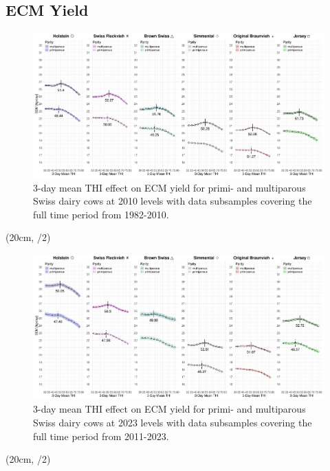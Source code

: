 \newpage
\begin{landscape}
    \thispagestyle{empty}
    \section{ECM Yield}
    \begin{figure}[H]
        \centering
        \includegraphics[width=0.85\paperheight]{thesis/figures/results/ecm_yield_before_2010.png}
        \caption[]{3-day mean THI effect on ECM yield for primi- and multiparous Swiss dairy cows at 2010 levels with data subsamples covering the full time period from 1982-2010.}
        \label{fig:results_ecm_yield_before_2010}
    \end{figure}
    
    \begin{textblock*}{2cm}(20cm, \dimexpr\paperheight/2)
    \end{textblock*}
\end{landscape}
\newpage

\begin{landscape}
    \thispagestyle{empty}
    \begin{figure}[ht]
        \centering
        \includegraphics[width=0.85\paperheight]{thesis/figures/results/ecm_yield_after_2010.png}
        \caption[]{3-day mean THI effect on ECM yield for primi- and multiparous Swiss dairy cows at 2023 levels with data subsamples covering the full time period from 2011-2023.}
        \label{fig:results_ecm_yield_after_2010}
    \end{figure}
    
    \begin{textblock*}{2cm}(20cm, \dimexpr\paperheight/2)
    \end{textblock*}
\end{landscape}